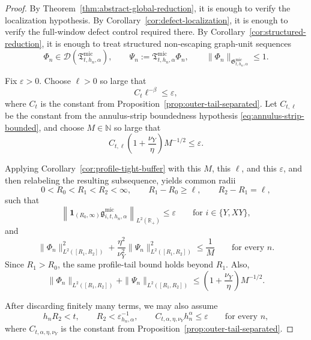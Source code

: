 \documentclass[11pt,a4paper]{amsart}
\theoremstyle{plain}
\theoremstyle{definition}
\theoremstyle{remark}
\newcommand{\R}{\mathbb{R}}
\newcommand{\one}{\mathbf 1}
\begin{document}
\begin{proof}
By Theorem~\ref{thm:abstract-global-reduction}, it is enough to verify the localization hypothesis.
By Corollary~\ref{cor:defect-localization}, it is enough to verify the full-window defect control
required there. By Corollary~\ref{cor:structured-reduction}, it is enough to treat structured
non-escaping graph-unit sequences
\[
\Phi_n\in\mathcal D(\mathfrak T_{t,h_n,\alpha}^{\mathrm{mic}}),
\qquad
\Psi_n:=\mathfrak T_{t,h_n,\alpha}^{\mathrm{mic}}\Phi_n,
\qquad
\|\Phi_n\|_{\mathfrak G_{t,h_n,\alpha}^{\mathrm{mic}}}\le1.
\]

Fix \(\varepsilon>0\). Choose \(\ell>0\) so large that
\[
C_t\ell^{-\beta}\le \varepsilon,
\]
where \(C_t\) is the constant from Proposition~\ref{prop:outer-tail-separated}. Let
\(C_{t,\ell}\) be the constant from the annulus-strip boundedness hypothesis
\eqref{eq:annulus-strip-bounded}, and choose \(M\in\mathbb N\) so large that
\[
C_{t,\ell}\left(1+\frac{\nu_Y}{\eta}\right)M^{-1/2}\le \varepsilon.
\]

Applying Corollary~\ref{cor:profile-tight-buffer} with this \(M\), this \(\ell\), and this
\(\varepsilon\), and then relabeling the resulting subsequence, yields common radii
\[
0<R_0<R_1<R_2<\infty,
\qquad
R_1-R_0\ge \ell,
\qquad
R_2-R_1=\ell,
\]
such that
\[
\left\|
\one_{(R_0,\infty)}
\mathfrak g_{i,t,h_n,\alpha}^{\mathrm{mic}}
\right\|_{L^2(\R_+)}
\le
\varepsilon
\qquad\text{for }i\in\{Y,XY\},
\]
and
\[
\|\Phi_n\|_{L^2([R_1,R_2])}^2
+
\frac{\eta^2}{\nu_Y^2}
\|\Psi_n\|_{L^2([R_1,R_2])}^2
\le
\frac{1}{M}
\qquad\text{for every }n.
\]
Since \(R_1>R_0\), the same profile-tail bound holds beyond \(R_1\). Also,
\[
\|\Phi_n\|_{L^2([R_1,R_2])}
+
\|\Psi_n\|_{L^2([R_1,R_2])}
\le
\left(1+\frac{\nu_Y}{\eta}\right)M^{-1/2}.
\]

After discarding finitely many terms, we may also assume
\[
h_nR_2<t,
\qquad
R_2<\varepsilon_{h_n,\alpha}^{-1},
\qquad
C_{t,\alpha,\eta,\nu_Y}h_n^\alpha\le \varepsilon
\qquad\text{for every }n,
\]
where \(C_{t,\alpha,\eta,\nu_Y}\) is the constant from
Proposition~\ref{prop:outer-tail-separated}.


\end{proof}
\end{document}
